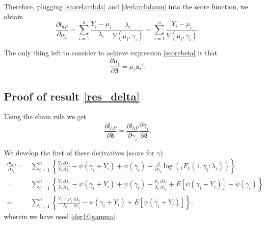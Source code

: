 Therefore, plugging \eqref{scorelambda} and \eqref{derlambdamu} into the score function, we obtain
\begin{equation}
    \frac{\partial l_{hP}}{\partial \mu_i} = \sum_{i=1}^n \frac{Y_i - \mu_i}{\lambda_i} \frac{\lambda_i}{V\left(\mu_i,\gamma_i\right)} = \sum_{i=1}^n \frac{Y_i - \mu_i}{V\left(\mu_i,\gamma_i\right)}.
\end{equation}

The only thing left to consider to achieve expression \eqref{scorebeta} is that
$$ \frac{\partial \mu_i}{\partial \boldsymbol{\beta}} = \mu_i \mathbf{x}_i'.$$

\subsection*{Proof of result \ref{res_delta}}

Using the chain rule we get
$$ \frac{\partial l_{hP}}{\partial \boldsymbol{\delta}} = \frac{\partial l_{hP}}{\partial \gamma_i} \frac{\partial \gamma_i}{\partial \boldsymbol{\delta}}. $$

We develop the first of these derivatives (score for $\gamma$)
\begin{align*}
    \frac{\partial l_{hP}}{\partial \gamma_i} = & \sum_{i=1}^n \left\{ \frac{Y_i}{\lambda_i} \frac{\partial \lambda_i}{\partial \gamma_i} - \psi\left(\gamma_i+Y_i\right) + \psi\left(\gamma_i\right) - \frac{\partial}{\partial \gamma_i} \log \left(_{1}F_{1}\left(1, \gamma_i; \lambda_i \right) \right) \right\} \\
    = & \sum_{i=1}^n \left\{ \frac{Y_i}{\lambda_i} \frac{\partial \lambda_i}{\partial \gamma_i} - \psi\left(\gamma_i+Y_i\right) + \psi\left(\gamma_i\right) - \frac{\mu_i}{\lambda_i} \frac{\partial \lambda_i}{\partial \gamma_i} + E \left[ \psi\left(\gamma_i+Y_i\right) \right] - \psi\left(\gamma_i\right) \right\} \\
    = & \sum_{i=1}^n \left\{ \frac{Y_i-\mu_i}{\lambda_i} \frac{\partial \lambda_i}{\partial \gamma_i} - \psi\left(\gamma_i+Y_i\right) + E \left[ \psi\left(\gamma_i+Y_i\right) \right] \right\},
\end{align*}
wherein we have used \eqref{der1f1gamma}.

